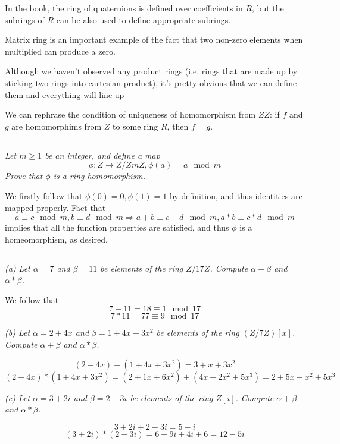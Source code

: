 \documentclass[11pt,oneside,titlepage]{book}
\DeclareMathOperator \ra {\Rightarrow}
\begin{document}
In the book, the ring of quaternions is defined over coefficients in
$R$, but the subrings of $R$ can be also used to define appropriate
subrings.

Matrix ring is an important example of the fact that two non-zero
elements when multiplied can produce a zero.

Although we haven't observed any product rings (i.e. rings that are
made up by sticking two rings into cartesian product), it's pretty
obvious that we can define them and everything will line up

We can rephrase the condition of uniqueness of homomorphism from $ZZ$:
if $f$ and $g$ are homomorphims from $Z$ to some ring $R$, then $f =
g$.


\subsection{}

\textit{Let $m \geq 1$ be an integer, and define a map
  $$\phi: Z \to Z/ZmZ, \phi(a) = a \mod m$$
  Prove that $\phi$ is a ring homomorphism.}

We firstly follow that $\phi(0) = 0, \phi(1) = 1$ by definition, and
thus identities are mapped properly. Fact that
$$a \equiv c \mod m, b \equiv d \mod m \ra a + b \equiv c + d \mod m, a * b \equiv c * d \mod m$$
implies that all the function properties are satisfied, and thus $\phi$ is a
homeomorphism, as desired.

\subsection{}

\textit{(a) Let $\alpha = 7$ and $\beta = 11$ be elements of the ring
  $Z/17Z$. Compute $\alpha + \beta$ and $\alpha * \beta$.}

We follow that
$$7 + 11 = 18 \equiv 1 \mod 17$$
$$7 * 11 = 77 \equiv 9 \mod 17$$

\textit{(b) Let $\alpha = 2 + 4x$ and $\beta = 1 + 4x + 3x^2$ be
  elements of the ring $(Z/7Z)[x]$. Compute $\alpha + \beta$ and $\alpha *
  \beta$.}

$$(2 + 4x) + (1 + 4x + 3x^2) = 3 + x + 3x^2$$
$$(2 + 4x) * (1 + 4x + 3x^2) = (2 + 1x + 6x^2) + (4x + 2x^2 + 5x^3) = 2 + 5x + x^2 + 5x^3$$

\textit{(c) Let $\alpha = 3 + 2i$ and $\beta = 2 - 3i$ be
  elements of the ring $Z[i]$. Compute $\alpha + \beta$ and $\alpha *
  \beta$.}

$$3 + 2i + 2 - 3i = 5 - i$$
$$(3 + 2i) * (2 - 3i) = 6 - 9i + 4i + 6 = 12 - 5i$$
\end{document}
